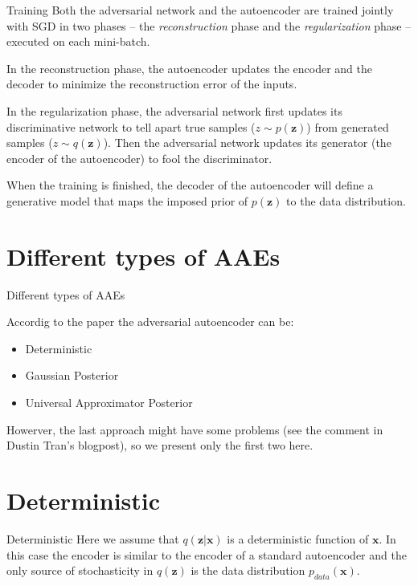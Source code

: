 \documentclass{beamer}
\begin{document}
\begin{frame}{Training}
  Both the adversarial network and the autoencoder are trained jointly with SGD in
  two phases -- the \emph{reconstruction} phase and the \emph{regularization} phase
  -- executed on each mini-batch.

  In the reconstruction phase, the autoencoder updates the encoder and the decoder
  to minimize the reconstruction error of the inputs.

  In the regularization phase, the adversarial network first updates its discriminative network
  to tell apart true samples ($z \sim p(\mathbf{z})$) from generated samples ($z \sim q(\mathbf{z})$).
  Then the adversarial network updates its generator (the encoder of the autoencoder) to fool
  the discriminator.

  When the training is finished, the decoder of the autoencoder will define a generative
  model that maps the imposed prior of $p(\mathbf{z})$ to the data distribution.
\end{frame}


\section{Different types of AAEs}

\begin{frame}{Different types of AAEs}

Accordig to the paper the adversarial autoencoder can be:
  \begin{itemize}
    \item Deterministic
    \item Gaussian Posterior
    \item Universal Approximator Posterior
  \end{itemize}
Howerver, the last approach might have some problems (see the comment in Dustin Tran's
blogpost), so we present only the first two here.
\end{frame}

\section{Deterministic}

\begin{frame}{Deterministic}
  Here we assume that $q(\mathbf{z}|\mathbf{x})$ is a deterministic function of
  $\mathbf{x}$. In this case the encoder is similar to the encoder of a standard
  autoencoder and the only source of stochasticity in $q(\mathbf{z})$ is the data
  distribution $p_{data}(\mathbf{x})$.

\end{frame}
\end{document}
